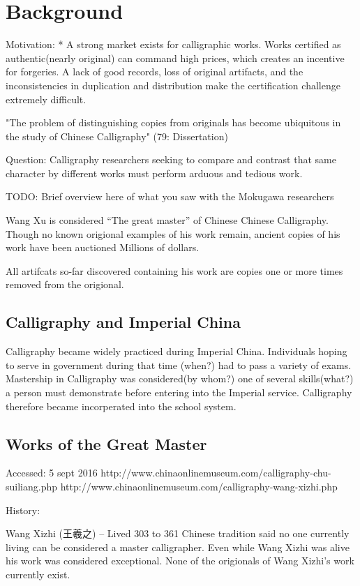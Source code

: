 \chapter{Background}
Motivation:
    *  A strong market exists for calligraphic works.  Works certified as authentic(nearly original) can command high prices, which creates an incentive for forgeries.  A lack of good records, loss of original artifacts, and the inconsistencies in duplication and distribution make the certification challenge extremely difficult.


"The problem of distinguishing copies from originals has become ubiquitous in the study of Chinese Calligraphy" (79: Dissertation)

    Question:  Calligraphy researchers seeking to compare and contrast that same character by different works must perform arduous and tedious work.
    
TODO: Brief overview here of what you saw with the Mokugawa researchers


Wang Xu is considered ``The great master'' of Chinese Chinese Calligraphy.  Though no known origional examples of his work remain, ancient copies of his work have been auctioned Millions of dollars.

All artifcats so-far discovered containing his work are copies one or more times removed from the origional.

\section{Calligraphy and Imperial China}

Calligraphy became widely practiced during Imperial China.  Individuals hoping to serve in government during that time (when?) had to pass a variety of exams.  Mastership in Calligraphy was considered(by whom?) one of several skills(what?) a person must demonstrate before entering into the Imperial service.  Calligraphy therefore became incorperated into the school system. 

\section{Works of the Great Master}
Accessed:  5 sept 2016
http://www.chinaonlinemuseum.com/calligraphy-chu-suiliang.php 
http://www.chinaonlinemuseum.com/calligraphy-wang-xizhi.php

History:

Wang Xizhi (王羲之) -- Lived 303 to 361
Chinese tradition said no one currently living can be considered a master calligrapher.  Even while Wang Xizhi was alive his work was considered exceptional.  None of the origionals of Wang Xizhi's work currently exist.


